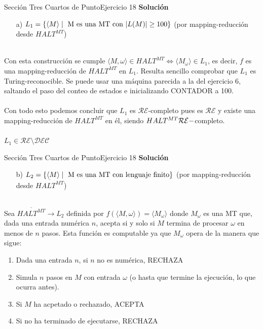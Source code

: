 \documentclass[10pt, envcountsect, presentation, aspectratio=169]{beamer}
\begin{document}

\begin{frame}{Sección Tres Cuartos de Punto}{Ejercicio 18}
    \textbf{Solución}\\
    \begin{itemize}
        \item[a)] $L_1 = \{\langle M \rangle \mid \hbox{ M es una MT con } |L(M)| \geq 100\}$ (por mapping-reducción desde $HALT^{MT}$) \\~\\
    \end{itemize}
    Con esta construcción se cumple $\langle M, \omega \rangle \in HALT^{MT} \Leftrightarrow \langle M_{\omega} \rangle \in L_1$, es decir, $f$ es una mapping-reducción de $HALT^{MT}$ en $L_1$. Resulta sencillo comprobar que $L_1$ es Turing-reconocible.
    Se puede usar una máquina parecida a la del ejercicio 6, saltando el paso del conteo de estados e inicializando CONTADOR a 100.\\~\\
    Con todo esto podemos concluir que $L_1$ es $\mathcal{RE}$-completo pues es $\mathcal{RE}$ y existe una mapping-reducción de $HALT^{MT}$ en él, siendo $HALT^{MT} \space \mathcal{RE}-$completo.\\~\\
    $L_1 \in \mathcal{RE} \setminus \mathcal{DEC}$ 
\end{frame}


\begin{frame}{Sección Tres Cuartos de Punto}{Ejercicio 18}
    \textbf{Solución}\\
    \begin{itemize}
        \item[b)] $L_2=\{\langle M \rangle \mid \hbox{ M es una MT con lenguaje finito}  \}$ (por mapping-reducción desde $\overline{HALT^{MT}}$)\\~\\
    \end{itemize}
    Sea $\overline{HALT^{MT}} \rightarrow L_2$ definida por $f(\langle M, \omega \rangle) = \langle M_{\omega} \rangle$ donde $M_{\omega}$ es una MT que, dada una entrada numérica $n$, acepta si y solo si $M$ termina de procesar $\omega$ en menos de $n$ pasos.
    Esta función es computable ya que $M_\omega$ opera de la manera que sigue:
    \begin{enumerate}
        \item Dada una entrada $n$, si $n$ no es numérica, RECHAZA
        \item Simula $n$ pasos en $M$ con entrada $\omega$ (o hasta que termine la ejecución, lo que ocurra antes).
        \item Si $M$ ha acpetado o rechazado, ACEPTA
        \item Si no ha terminado de ejecutarse, RECHAZA
    \end{enumerate}  
\end{frame}
\end{document}
